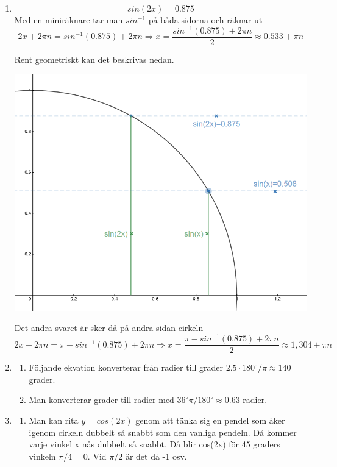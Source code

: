 \documentclass[a4paper,12pt]{article}
\begin{document}
\begin{enumerate}
      \item $$sin(2x)=0.875$$
            Med en miniräknare tar man $sin^{-1}$ på båda sidorna och räknar ut
            $$2x+2\pi n=sin^{-1}(0.875)+2\pi n \Rightarrow x=\frac{sin^{-1}(0.875)+2\pi n}{2}\approx 0.533+\pi n$$

            Rent geometriskt kan det beskrivas nedan.

            \includegraphics[scale=0.5]{Figur1.png}

            Det andra svaret är sker då på andra sidan cirkeln
            $$2x+2\pi n=\pi - sin^{-1}(0.875)+2\pi n \Rightarrow x=\frac{\pi - sin^{-1}(0.875)+2\pi n}{2}\approx 1,304+\pi n$$

      \item \begin{enumerate}
                  \item Följande ekvation konverterar från radier till grader $2.5\cdot180^\circ/\pi\approx 140$ grader.

                  \item Man konverterar grader till radier med $36^\circ\pi/180^\circ\approx 0.63$ radier.
            \end{enumerate}
      \item
            \begin{enumerate}
                  \item Man kan rita $y=cos(2x)$ genom att tänka sig en pendel som åker igenom cirkeln dubbelt
                        så snabbt som den vanliga pendeln. Då kommer varje vinkel x nås dubbelt så snabbt. Då blir
                        cos(2x) för 45 graders vinkeln $\pi/4=0$. Vid $\pi/2$ är det då -1 osv.


\end{enumerate}
\end{enumerate}
\end{document}
